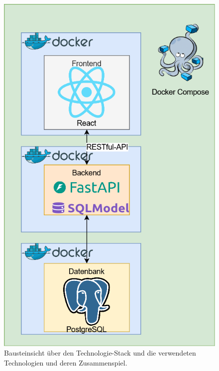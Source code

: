 \documentclass[conference,a4paper]{cs-techrep}
\begin{document}
\begin{figure}[h]
	\centering
	\includegraphics[width=0.9\linewidth]{Bausteinsicht-Architektur.drawio}
	\caption{Bausteinsicht über den Technologie-Stack und die verwendeten Technologien und deren Zusammenspiel.}
	\label{fig:bausteinsicht-architektur}
\end{figure}
\end{document}
